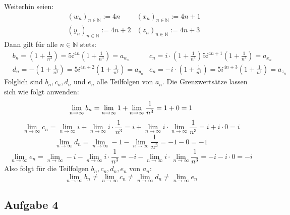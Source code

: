 \documentclass[a4paper,graphics,11pt]{article}
\newcommand{\aufgabe}[1]{\subsection*{Aufgabe #1}}
\begin{document}
Weiterhin seien:
\begin{align*}
    &(w_n)_{n\in \mathbb{N}} := 4n&
    (x_n)_{n\in \mathbb{N}} := 4n+1\\
    &(y_n)_{n\in \mathbb{N}} := 4n+2&
    (z_n)_{n\in \mathbb{N}} := 4n+3
\end{align*}
Dann gilt für alle $n\in \mathbb{N}$ stets:
\begin{align*}
    &b_n = \left(1+\frac{1}{n^3}\right)=  5i^{4n}\left(1+\frac{1}{n^3}\right) = a_{w_n}&
    c_n = i\cdot\left(1+\frac{1}{n^3}\right)5i^{4n+1}\left(1+\frac{1}{n^3}\right) = a_{x_n}\\
    &d_n = -\left(1+\frac{1}{n^3}\right) = 5i^{4n+2}\left(1+\frac{1}{n^3}\right) = a_{y_n}&
    e_n = -i\cdot\left(1+\frac{1}{n^3}\right)=5i^{4n+3}\left(1+\frac{1}{n^3}\right) = a_{z_n}
\end{align*}
Folglich sind $b_n,c_n,d_n$ und $e_n$ alle Teilfolgen von $a_n$.
Die Grenzwertsätze lassen sich wie folgt anwenden:
$$
    \lim_{n \to \infty} b_n
    = \lim_{n \to \infty} 1+ \lim_{n \to \infty} \frac{1}{n^3}
    = 1+0 =1\\
$$$$
    \lim_{n \to \infty} c_n
    = \lim_{n \to \infty} i+ \lim_{n \to \infty} i\cdot \frac{1}{n^3}
    = i+\lim_{n \to \infty} i\cdot \lim_{n \to \infty} \frac{1}{n^3}
    = i+i\cdot 0 = i
$$$$
    \lim_{n \to \infty} d_n
    = \lim_{n \to \infty} -1 - \lim_{n \to \infty} \frac{1}{n^3}
    = -1 - 0 = -1
$$$$
   \lim_{n \to \infty} e_n
    = \lim_{n \to \infty} -i- \lim_{n \to \infty} i\cdot \frac{1}{n^3}
    = -i-\lim_{n \to \infty} i\cdot \lim_{n \to \infty} \frac{1}{n^3}
    = -i-i\cdot 0 = -i
$$
Also folgt für die Teilfolgen $b_n,c_n,d_n,e_n$ von $a_n\colon$
$$
    \lim_{n \to \infty} b_n \neq
    \lim_{n \to \infty} c_n \neq
    \lim_{n \to \infty} d_n \neq
    \lim_{n \to \infty} e_n
$$
\newpage
\aufgabe{4}
\end{document}
